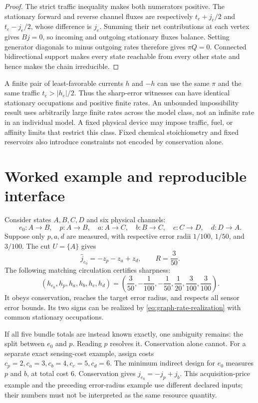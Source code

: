 \begin{proof}
The strict traffic inequality makes both numerators positive. The stationary
forward and reverse channel fluxes are respectively $t_e+j_e/2$ and
$t_e-j_e/2$, whose difference is $j_e$. Summing their net contributions at
each vertex gives $Bj=0$, so incoming and outgoing stationary fluxes balance.
Setting generator diagonals to minus outgoing rates therefore gives
$\pi Q=0$. Connected bidirectional support makes every state reachable from
every other state and hence makes the chain irreducible.
\end{proof}

A finite pair of least-favorable currents $h$ and $-h$ can use the same $\pi$
and the same traffic $t_e>|h_e|/2$. Thus the sharp-error witnesses can have
identical stationary occupations and positive finite rates. An unbounded
impossibility result uses arbitrarily large finite rates across the model
class, not an infinite rate in an individual model. A fixed physical device
may impose traffic, fuel, or affinity limits that restrict this class. Fixed
chemical stoichiometry and fixed reservoirs also introduce constraints not
encoded by conservation alone.

\section{Worked example and reproducible interface}

Consider states $A,B,C,D$ and six physical channels:
\begin{equation}
 e_0:A\to B,\quad p:A\to B,\quad
 a:A\to C,\quad b:B\to C,\quad c:C\to D,\quad d:D\to A.
\end{equation}
Suppose only $p,a,d$ are measured, with respective error radii
$1/100$, $1/50$, and $3/100$. The cut $U=\{A\}$ gives
\begin{equation}
 \widehat j_{e_0}=-z_p-z_a+z_d,\qquad R=\frac{3}{50}.
\end{equation}
The following matching circulation certifies sharpness:
\begin{equation}
 (h_{e_0},h_p,h_a,h_b,h_c,h_d)
 =\left(\frac3{50},-\frac1{100},-\frac1{50},
                  \frac1{20},\frac3{100},\frac3{100}\right).
\end{equation}
It obeys conservation, reaches the target error radius, and respects all
sensor error bounds. Its two signs can be realized by
\eqref{eq:graph-rate-realization} with common stationary occupations.

If all five bundle totals are instead known exactly, one ambiguity remains:
the split between $e_0$ and $p$. Reading $p$ resolves it. Conservation alone
cannot. For a separate exact sensing-cost example, assign costs
$c_p=2,c_a=3,c_b=4,c_c=5,c_d=6$. The minimum indirect design for $e_0$ measures
$p$ and $b$, at total cost $6$. Conservation gives $j_{e_0}=-j_p+j_b$.
This acquisition-price example and the preceding error-radius example use
different declared inputs; their numbers must not be interpreted as the same
resource quantity.

